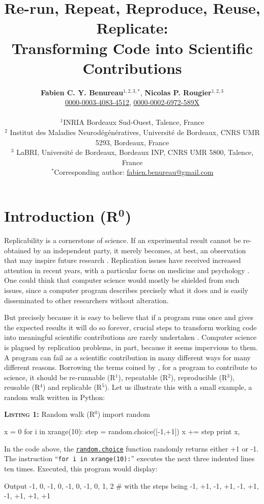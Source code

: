 \documentclass[a4paper,11pt]{article}
\title{Re-run, Repeat, Reproduce, Reuse, Replicate:\\Transforming Code into Scientific Contributions}
\author{
  \textbf{Fabien C. Y. Benureau}$^{1,2,3,*}$,
  \textbf{Nicolas P. Rougier}$^{1,2,3}$\\
  {\small \href{https://orcid.org/0000-0003-4083-4512}{0000-0003-4083-4512},
  \href{https://orcid.org/0000-0002-6972-589X}{0000-0002-6972-589X}}\\
  \begin{minipage}{0.8\textwidth}
    \begin{center}
      \vspace{2mm}
      \scriptsize
      $^{1}$INRIA Bordeaux Sud-Ouest, Talence, France\\
      $^{2}$ Institut des Maladies Neurodégénératives, Université de Bordeaux, CNRS UMR 5293, Bordeaux, France\\
      $^{3}$ LaBRI, Université de Bordeaux, Bordeaux INP, CNRS UMR 5800, Talence, France\\
      \vspace{2mm}
      $^{*}$Corresponding author:
      \href{mailto:fabien.benureau@gmail.com}{fabien.benureau@gmail.com}
    \end{center}
  \end{minipage}
}
\date{}
\begin{document}
\maketitle
\section*{Introduction (R$^{\mathbf 0}$)}

Replicability is a cornerstone of science.  If an experimental result cannot be
re-obtained by an independent party, it merely becomes, at best, an observation
that may inspire future research \citep{Mesirov:2010,osc:2015}. Replication
issues have received increased attention in recent years, with a particular focus on medicine and psychology \citep{Iqbal:2016}.  One could think
that computer science would mostly be shielded from such issues, since a
computer program describes precisely what it does and is easily
disseminated to other researchers without alteration.

But precisely because it is easy to believe that if a program runs once and
gives the expected results it will do so forever, crucial steps to transform
working code into meaningful scientific contributions are rarely undertaken
\citep{Sandve:2013,Schwab:2000}. Computer science is plagued by replication
problems, in part, because it seems impervious to them. A program can
fail as a scientific contribution in many different ways for many different
reasons. Borrowing the terms coined by \citeauthor{Goble:2016}
\citep{Goble:2016}, for a program to contribute to science, it should be
re-runnable (R$^1$), repeatable (R$^2$), reproducible (R$^3$),
reusable (R$^4$) and replicable (R$^5$). Let us illustrate this with a small
example, a random walk \citep{Hughes:1995} written in Python:\\

\noindent \begin{minipage}[c]{\linewidth}
\begin{code}{\textbf{\textsc{Listing 1:}} Random walk (R$^0$)}
import random

x = 0
for i in xrange(10):
    step = random.choice([-1,+1])
    x += step
    print x,
\end{code}
\end{minipage}

In the code above, the {\tt \href{https://docs.python.org/3.6/library/random.html#random.choice}{random.choice}} function randomly returns either +1 or -1. The instruction \enquote{\tt for i in xrange(10):}  executes the next three indented lines ten times. Executed, this program would display:
\begin{code}{Output}
-1, 0, -1, 0, -1, 0, -1, 0, 1, 2 # with the steps being -1, +1, -1, +1, -1, +1, -1, +1, +1, +1
\end{code}
\end{document}
